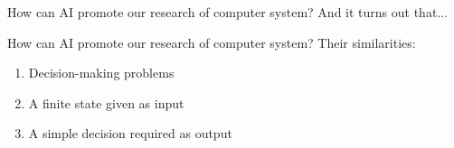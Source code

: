 \documentclass[UTF8]{beamer}
\begin{document}
\begin{frame}{How can AI promote our research of computer system?}
  And it turns out that...
  \begin{center} 
  \end{center} 
\end{frame}

\begin{frame}{How can AI promote our research of computer system?}
  Their similarities:
  \begin{enumerate}
    \item<2-> Decision-making problems
    \item<3-> A finite state given as input
    \item<4-> A simple decision required as output
  \end{enumerate}

\end{frame}
\end{document}
